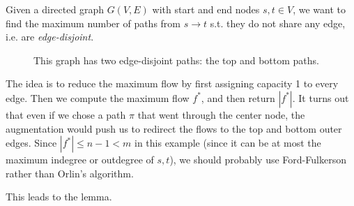 \documentclass{article}
\begin{document}
    \begin{example}
      Given a directed graph $G(V, E)$ with start and end nodes $s, t \in V$, we want to find the maximum number of paths from $s \rightarrow t$ s.t. they do not share any edge, i.e. are \textit{edge-disjoint}. 
      \begin{figure}[H]
        \centering 
        \caption{This graph has two edge-disjoint paths: the top and bottom paths. } 
        \label{fig:edge_disjoint}
      \end{figure}
      
      The idea is to reduce the maximum flow by first assigning capacity 1 to every edge. Then we compute the maximum flow $f^\ast$, and then return $|f^\ast|$. It turns out that even if we chose a path $\pi$ that went through the center node, the augmentation would push us to redirect the flows to the top and bottom outer edges. Since $|f^\ast| \leq n-1 < m$ in this example (since it can be at most the maximum indegree or outdegree of $s, t$), we should probably use Ford-Fulkerson rather than Orlin's algorithm. 
    \end{example}

    This leads to the lemma. 
\end{document}
